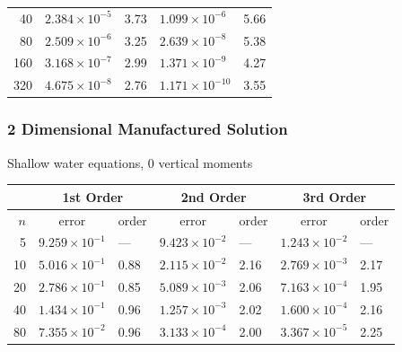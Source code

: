 \documentclass[10pt]{beamer}
\begin{document}
\begin{frame}
\begin{table}
\begin{tabular}{r*{4}l}
      40    & \( 2.384 \times 10^{ -5} \)   & 3.73                          & \( 1.099 \times 10^{ -6} \) & 5.66  \\
      80    & \( 2.509 \times 10^{ -6} \)   & 3.25                          & \( 2.639 \times 10^{ -8} \) & 5.38  \\
      160   & \( 3.168 \times 10^{ -7} \)   & 2.99                          & \( 1.371 \times 10^{ -9} \) & 4.27  \\
      320   & \( 4.675 \times 10^{ -8} \)   & 2.76                          & \( 1.171 \times 10^{-10} \) & 3.55  \\
      \bottomrule
    \end{tabular}
  \end{table}
\end{frame}

\begin{frame}
  \frametitle{2 Dimensional Manufactured Solution}
  Shallow water equations, 0 vertical moments
  \footnotesize
  \begin{table}
    \centering
    \begin{tabular}{r*{6}l}
      \toprule
            & \multicolumn{2}{c}{1st Order} & \multicolumn{2}{c}{2nd Order} & \multicolumn{2}{c}{3rd Order}                                              \\
      \midrule
      \(n\) & \multicolumn{1}{c}{error}     & order                         & \multicolumn{1}{c}{error}     & order & \multicolumn{1}{c}{error}  & order \\
      \midrule
      5     & \( 9.259 \times 10^{-1} \)    & ---                           & \( 9.423 \times 10^{-2} \)    & ---   & \( 1.243 \times 10^{-2} \) & ---   \\
      10    & \( 5.016 \times 10^{-1} \)    & 0.88                          & \( 2.115 \times 10^{-2} \)    & 2.16  & \( 2.769 \times 10^{-3} \) & 2.17  \\
      20    & \( 2.786 \times 10^{-1} \)    & 0.85                          & \( 5.089 \times 10^{-3} \)    & 2.06  & \( 7.163 \times 10^{-4} \) & 1.95  \\
      40    & \( 1.434 \times 10^{-1} \)    & 0.96                          & \( 1.257 \times 10^{-3} \)    & 2.02  & \( 1.600 \times 10^{-4} \) & 2.16  \\
      80    & \( 7.355 \times 10^{-2} \)    & 0.96                          & \( 3.133 \times 10^{-4} \)    & 2.00  & \( 3.367 \times 10^{-5} \) & 2.25  \\
      \bottomrule
    \end{tabular}

\end{table}
\end{frame}
\end{document}
